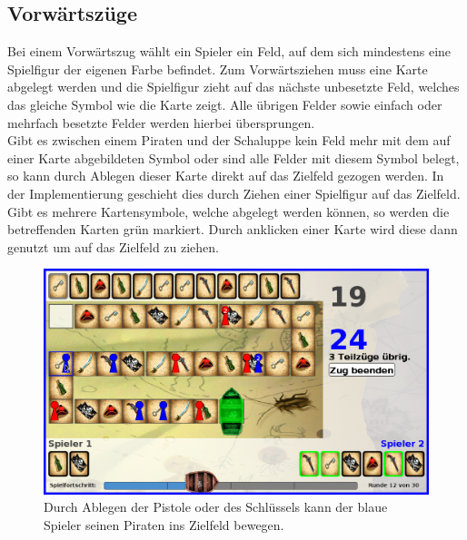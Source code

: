\documentclass[a4paper, ngerman]{scrartcl}
\begin{document}
	
	
	\subsection{Vorwärtszüge}
	Bei einem Vorwärtszug wählt ein Spieler ein Feld, auf dem sich mindestens eine 
	Spiel\-figur der eigenen Farbe befindet. Zum Vorwärtsziehen muss eine Karte
	abgelegt werden und die Spielfigur zieht auf das nächste unbesetzte Feld,
	welches das gleiche Symbol wie die Karte zeigt. Alle übrigen Felder sowie
	einfach oder mehrfach besetzte Felder werden hierbei übersprungen.\\
	Gibt es zwischen einem Piraten und der Schaluppe kein Feld mehr mit dem auf
	einer Karte abgebildeten Symbol oder sind alle Felder mit diesem Symbol
	belegt, so kann durch Ablegen dieser Karte direkt auf das Zielfeld gezogen
	werden. In der Implementierung geschieht dies durch Ziehen einer Spielfigur auf
	das Zielfeld. Gibt es mehrere Kartensymbole, welche abgelegt werden können, so
	werden die betreffenden Karten grün markiert. Durch anklicken einer Karte wird
	diese dann genutzt um auf das Zielfeld zu ziehen.
	
	\begin{figure}[h]
		\centering
		\includegraphics[scale = 0.3]{bilder/zielfeld}
		\caption{Durch Ablegen der Pistole oder des Schlüssels kann der blaue Spieler
		seinen Piraten ins Zielfeld bewegen.}
		\label{fig:Zielfeld}
	\end{figure}
	 
\end{document}
